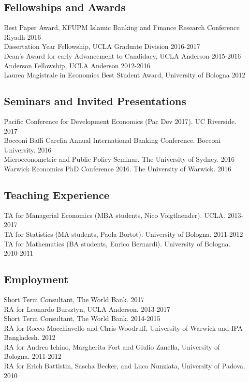 \subsection*{Fellowships and Awards}
%
Best Paper Award, KFUPM Islamic Banking and Finance Research Conference Riyadh \hfill 2016\\
Dissertation Year Fellowship, UCLA Graduate Division \hfill 2016-2017\\
Dean's Award for early Advancement to Candidacy, UCLA Anderson \hfill 2015-2016\\
Anderson Fellowship, UCLA Anderson \hfill 2012-2016\\
Laurea Magistrale in Economics Best Student Award, University of Bologna \hfill 2012\\

\subsection*{Seminars and Invited Presentations}
Pacific Conference for Development Economics (Pac Dev 2017). UC Riverside. \hfill 2017 \\
Bocconi Baffi Carefin Annual International Banking Conference. Bocconi University. \hfill 2016 \\
Microeconometric and Public Policy Seminar. The University of Sydney. \hfill 2016 \\
Warwick Economics PhD Conference 2016. The University of Warwick. \hfill 2016\\

\subsection*{Teaching Experience}
%
TA for Managerial Economics (MBA students, Nico Voigtlaender). UCLA. \hfill 2013-2017\\
TA for Statistics (MA students, Paola Bortot). University of Bologna. \hfill 2011-2012\\
TA for Mathematics (BA students, Enrico Bernardi). University of Bologna. \hfill 2010-2011\\

\subsection*{Employment}
Short Term Consultant, The World Bank. \hfill 2017\\
RA for Leonardo Bursztyn, UCLA Anderson. \hfill 2013-2017\\
Short Term Consultant, The World Bank. \hfill 2014-2015\\
RA for Rocco Macchiavello and Chris Woodruff, University of Warwick and IPA-Bangladesh. \hfill 2012\\
RA for Andrea Ichino, Margherita Fort and Giulio Zanella, University of Bologna. \hfill 2011-2012\\
RA for Erich Battistin, Sascha Becker, and Luca Nunziata, University of Padova. \hfill 2010\\

\clearpage
